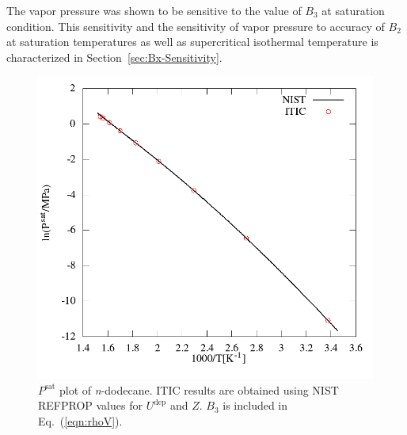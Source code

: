 \documentclass[%
 aip,
 jcp,
 sd,%
 amsmath,amssymb,
 reprint,%
]{revtex4-1}
\begin{document}
The vapor pressure was shown to be sensitive to the value of $B_3$ at saturation condition. This sensitivity and the sensitivity of vapor pressure to accuracy of $B_2$ at saturation temperatures as well as supercritical isothermal temperature is characterized in Section~\ref{sec:Bx-Sensitivity}.

\begin{figure} 
\includegraphics[scale=0.4]{Figures/NIST-VAL_FTT_psat.png}
\caption{$P^{\mathrm{sat}}$ plot of \textit{n}-dodecane. ITIC results are obtained using NIST REFPROP values \cite{Lemmon2004} for $U^{\mathrm{dep}}$ and $Z$. $B_3$ is included in Eq.~(\ref{eqn:rhoV}).}
\label{fig:NIST-VALIDATION_C12_FTT_Psat}
\end{figure}
\end{document}
